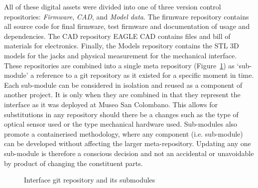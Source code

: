 All of these digital assets were divided into one of three version control repositories: \emph{Firmware}, \emph{CAD}, and \emph{Model data}. The firmware repository \cite{hamilton_firmware_2025} contains all source code for final firmware, test firmware and documentation of usage and dependencies. The CAD repository \cite{hamilton_cad_2025} EAGLE CAD contains files and bill of materials for electronics. Finally, the Models repository \cite{hamilton_models_2025} contains the STL 3D models for the jacks and physical measurement for the mechanical interface. These repositories are combined into a single meta repository (Figure~\ref{fig:repo-relation}) as `sub-module' a reference to a git repository as it existed for a specific moment in time. Each sub-module can be considered in isolation and reused as a component of another project.  It is only when they are combined in \textcite{hamilton_nemus_2025} that they represent the interface as it was deployed at Museo San Colombano. This allows for substitutions in any repository should there be a changes such as the type of optical sensor used or the type mechanical hardware used. Sub-modules also promote a containerised methodology, where any component (i.e. sub-module) can be developed without affecting the larger meta-repository. Updating any one sub-module is therefore a conscious decision and not an accidental or unavoidable by product of changing the constituent parts. 

\begin{figure}
\centering

    \caption{Interface git repository and its submodules}
    \label{fig:repo-relation}
\end{figure}

